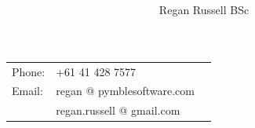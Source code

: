 \documentclass{article}
\begin{document}




\title{  }
\author{Regan Russell BSc}
\maketitle



\begin{center}  
\begin{tabular}{ lll }
Phone:  & +61 41 428 7577  \\ 
Email:  & regan  {@} pymblesoftware.com   \\
            & regan.russell @ gmail.com  
\end{tabular}


\end{center}

\usetikzlibrary{decorations.text}


% 




% 
\end{document}
